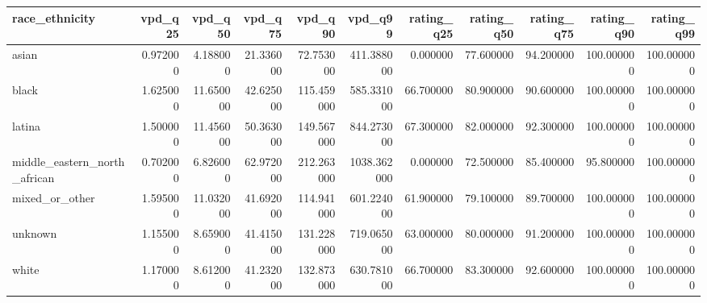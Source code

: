 \begin{tabular}{lrrrrrrrrrr}
\toprule
race_ethnicity & vpd_q25 & vpd_q50 & vpd_q75 & vpd_q90 & vpd_q99 & rating_q25 & rating_q50 & rating_q75 & rating_q90 & rating_q99 \\
\midrule
asian & 0.972000 & 4.188000 & 21.336000 & 72.753000 & 411.388000 & 0.000000 & 77.600000 & 94.200000 & 100.000000 & 100.000000 \\
black & 1.625000 & 11.650000 & 42.625000 & 115.459000 & 585.331000 & 66.700000 & 80.900000 & 90.600000 & 100.000000 & 100.000000 \\
latina & 1.500000 & 11.456000 & 50.363000 & 149.567000 & 844.273000 & 67.300000 & 82.000000 & 92.300000 & 100.000000 & 100.000000 \\
middle_eastern_north_african & 0.702000 & 6.826000 & 62.972000 & 212.263000 & 1038.362000 & 0.000000 & 72.500000 & 85.400000 & 95.800000 & 100.000000 \\
mixed_or_other & 1.595000 & 11.032000 & 41.692000 & 114.941000 & 601.224000 & 61.900000 & 79.100000 & 89.700000 & 100.000000 & 100.000000 \\
unknown & 1.155000 & 8.659000 & 41.415000 & 131.228000 & 719.065000 & 63.000000 & 80.000000 & 91.200000 & 100.000000 & 100.000000 \\
white & 1.170000 & 8.612000 & 41.232000 & 132.873000 & 630.781000 & 66.700000 & 83.300000 & 92.600000 & 100.000000 & 100.000000 \\
\bottomrule
\end{tabular}
